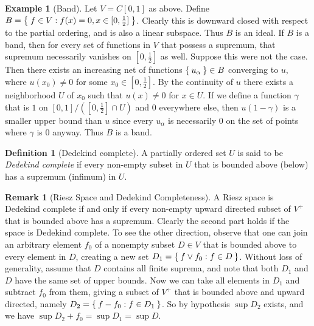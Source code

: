 \documentclass[letterpaper,10pt,oneside,onecolumn,reqno]{amsart}
\theoremstyle{definition}
\newtheorem{defn}{Definition}
\newtheorem{rem}{Remark}
\newtheorem{exa}{Example}
\newcommand{\join}{\vee}
\begin{document}
\begin{exa}[Band]\label{exa:2}
  Let $V=C[0,1]$ as above. Define $B = \Set{f \in V : f(x) = 0, x \in
    [0, \frac{1}{2}]}$. Clearly this is downward closed with respect
  to the partial ordering, and is also a linear subspace. Thus $B$ is
  an ideal. If $B$ is a band, then for every set of functions in $V$
  that possess a supremum, that supremum necessarily vanishes on
  $[0,\frac{1}{2}]$ as well. Suppose this were not the case. Then
  there exists an increasing net of functions $\Set{u_{\alpha}} \in B$
  converging to $u$, where $u(x_{0}) \neq 0 $ for some $x_0 \in
  [0,\frac{1}{2}]$. By the continuity of $u$ there exists a
  neighborhood $U$ of $x_0$ such that $u(x) \neq 0$ for $x \in U$. If
  we define a function $\gamma$ that is $1$ on $[0,1]/([0,\frac{1}{2}]
  \cap U)$ and $0$ everywhere else, then $u(1 - \gamma)$ is a smaller
  upper bound than $u$ since every $u_{\alpha}$ is necessarily $0$ on
  the set of points where $\gamma$ is $0$ anyway. Thus $B$ is a band.

\end{exa}



\begin{defn}[Dedekind complete]\label{def:12}
  A partially ordered set $U$ is said to be \emph{Dedekind complete} if every non-empty subset in $U$
  that is bounded above (below) has a supremum (infimum) in $U$.
\end{defn}

\begin{rem}[Riesz Space and Dedekind Completeness]\label{rem:3}
  A Riesz space is Dedekind complete if and only if every non-empty
  upward directed subset of $V^+$ that is bounded above has a
  supremum. Clearly the second part holds if the space is Dedekind
  complete. To see the other direction, observe that one can join an
  arbitrary element $f_0$ of a nonempty subset $D \in V$ that is
  bounded above to every element in $D$, creating a new set $D_1 =
  \Set{f \join f_0 : f \in D}$. Without loss of generality, assume
  that $D$ contains all finite suprema, and note that both $D_1$ and
  $D$ have the same set of upper bounds. Now we can take all elements
  in $D_1$ and subtract $f_0$ from them, giving a subset of $V^+$ that
  is bounded above and upward directed, namely $D_2 = \Set{f-f_0 : f
    \in D_1}$. So by hypothesis $\sup{D_2}$ exists, and we have
  $\sup{D_2} + f_0=\sup{D_1}=\sup{D}$.
\end{rem}
\end{document}
